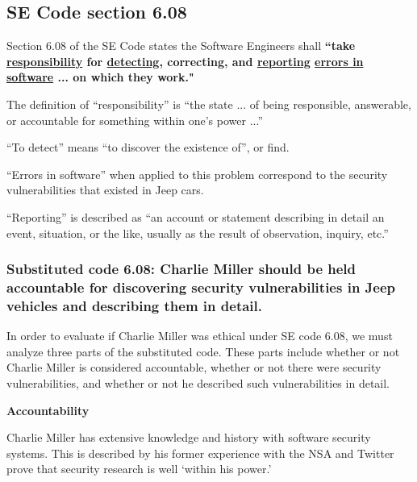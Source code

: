 \documentclass[12pt]{article}
\begin{document}
\begin{multicols}{2}

\subsection{SE Code section 6.08}

Section 6.08 of the SE Code states the Software Engineers shall \textbf{``take \underline{responsibility} for \underline{detecting}, correcting, and \underline{reporting} \underline{errors in software} ... on which they work."}\cite{seCode}

The definition of ``responsibility'' is ``the state ... of being responsible, answerable, or accountable for something within one's power ...''\cite{dictionary}

``To detect'' means ``to discover the existence of''\cite{dictionary}, or find.

``Errors in software'' when applied to this problem correspond to the security vulnerabilities that existed in Jeep cars. 

``Reporting'' is described as ``an account or statement describing in detail an event, situation, or the like, usually as the result of observation, inquiry, etc.''\cite{dictionary}

\subsubsection{Substituted code 6.08: Charlie Miller should be held accountable for discovering security vulnerabilities in Jeep vehicles and describing them in detail.}

In order to evaluate if Charlie Miller was ethical under SE code 6.08, we must analyze three parts of the substituted code. These parts include whether or not Charlie Miller is considered accountable, whether or not there were security vulnerabilities, and whether or not he described such vulnerabilities in detail. 

\vspace{.5cm}\hspace{-.5cm}\textbf{Accountability}\vspace{.2cm}

Charlie Miller has extensive knowledge and history with software security systems. This is described by his former experience with the NSA and Twitter\cite{linkedin} prove that security research is well `within his power.' 



\end{multicols}
\end{document}
